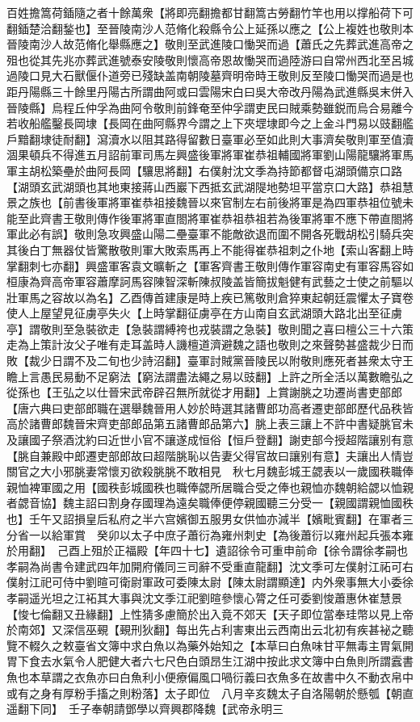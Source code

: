 百姓擔篙荷鍤隨之者十餘萬衆【將即亮翻擔都甘翻篙古勞翻竹竿也用以撑船荷下可翻鍤楚洽翻鍫也】至晉陵南沙人范脩化殺縣令公上延孫以應之【公上複姓也敬則本晉陵南沙人故范脩化舉縣應之】敬則至武進陵口慟哭而過【蕭氏之先葬武進高帝之殂也從其先兆亦葬武進號泰安陵敬則懷高帝恩故慟哭而過陸游曰自常州西北至呂城過陵口見大石獸偃仆道旁已殘缺盖南朝陵墓齊明帝時王敬則反至陵口慟哭而過是也距丹陽縣三十餘里丹陽古所謂曲阿或曰雲陽宋白曰吳大帝改丹陽為武進縣吳末併入晉陵縣】烏程丘仲孚為曲阿令敬則前鋒奄至仲孚謂吏民曰賊乘勢雖鋭而烏合易離今若收船艦鑿長岡埭【長岡在曲阿縣界今謂之上下夾堽埭即今之上金斗門易以豉翻艦戶黯翻埭徒耐翻】瀉瀆水以阻其路得留數日臺軍必至如此則大事濟矣敬則軍至值瀆涸果頓兵不得進五月詔前軍司馬左興盛後軍將軍崔恭祖輔國將軍劉山陽龍驤將軍馬軍主胡松築壘於曲阿長岡【驤思將翻】右僕射沈文季為持節都督屯湖頭備京口路【湖頭玄武湖頭也其地東接蔣山西巖下西抵玄武湖隄地勢坦平當京口大路】恭祖慧景之族也【前書後軍將軍崔恭祖接魏晉以來官制左右前後將軍是為四軍恭祖位號未能至此齊書王敬則傳作後軍將軍直閤將軍崔恭祖恭祖若為後軍將軍不應下帶直閤將軍此必有誤】敬則急攻興盛山陽二壘臺軍不能敵欲退而圍不開各死戰胡松引騎兵突其後白丁無器仗皆驚散敬則軍大敗索馬再上不能得崔恭祖刺之仆地【索山客翻上時掌翻刺七亦翻】興盛軍客袁文曠斬之【軍客齊書王敬則傳作軍容南史有軍容馬容如桓康為齊高帝軍容蕭摩訶馬容陳智深斬陳叔陵盖皆簡拔魁健有武藝之士使之前驅以壯軍馬之容故以為名】乙酉傳首建康是時上疾已篤敬則倉猝東起朝廷震懼太子寶卷使人上屋望見征虜亭失火【上時掌翻征虜亭在方山南自玄武湖頭大路北出至征虜亭】謂敬則至急裝欲走【急裝謂縛袴也戎裝謂之急裝】敬則聞之喜曰檀公三十六策走為上策計汝父子唯有走耳盖時人譏檀道濟避魏之語也敬則之來聲勢甚盛裁少日而敗【裁少日謂不及二旬也少詩沼翻】臺軍討賊黨晉陵民以附敬則應死者甚衆太守王瞻上言愚民易動不足窮法【窮法謂盡法繩之易以豉翻】上許之所全活以萬數瞻弘之從孫也【王弘之以仕晉宋武帝辟召無所就從才用翻】上賞謝脁之功遷尚書吏部郎【唐六典曰吏部郎職在選舉魏晉用人妙於時選其諸曹郎功高者遷吏部郎歷代品秩皆高於諸曹郎魏晉宋齊吏部郎品第五諸曹郎品第六】朓上表三讓上不許中書疑朓官未及讓國子祭酒沈約曰近世小官不讓遂成恒俗【恒戶登翻】謝吏部今授超階讓别有意【朓自兼殿中郎遷吏部郎故曰超階朓恥以告妻父得官故曰讓别有意】夫讓出人情豈關官之大小邪朓妻常懷刃欲殺朓朓不敢相見　秋七月魏彭城王勰表以一歲國秩職俸親恤裨軍國之用【國秩彭城國秩也職俸勰所居職合受之俸也親恤亦魏朝給勰以恤親者勰音協】魏主詔曰割身存國理為遠矣職俸便停親國聽三分受一【親國謂親恤國秩也】壬午又詔損皇后私府之半六宫嬪御五服男女供恤亦減半【嬪毗賓翻】在軍者三分省一以給軍賞　癸卯以太子中庶子蕭衍為雍州刺史【為後蕭衍以雍州起兵張本雍於用翻】　己酉上殂於正福殿【年四十七】遺詔徐令可重申前命【徐令謂徐孝嗣也孝嗣為尚書令建武四年加開府儀同三司辭不受重直龍翻】沈文季可左僕射江祏可右僕射江祀可侍中劉暄可衛尉軍政可委陳太尉【陳太尉謂顯達】内外衆事無大小委徐孝嗣遥光坦之江袥其大事與沈文季江祀劉暄參懷心膂之任可委劉悛蕭惠休崔慧景【悛七倫翻又丑緣翻】上性猜多慮簡於出入竟不郊天【天子即位當奉珪幣以見上帝於南郊】又深信巫覡【覡刑狄翻】每出先占利害東出云西南出云北初有疾甚袐之聽覽不輟久之敕臺省文簿中求白魚以為藥外始知之【本草曰白魚味甘平無毒主胃氣開胃下食去水氣令人肥健大者六七尺色白頭昂生江湖中按此求文簿中白魚則所謂蠧書魚也本草謂之衣魚亦曰白魚利小便療偏風口喎衍義曰衣魚多在故書中久不動衣帛中或有之身有厚粉手搐之則粉落】太子即位　八月辛亥魏太子自洛陽朝於懸瓠【朝直遥翻下同】　壬子奉朝請鄧學以齊興郡降魏【武帝永明三